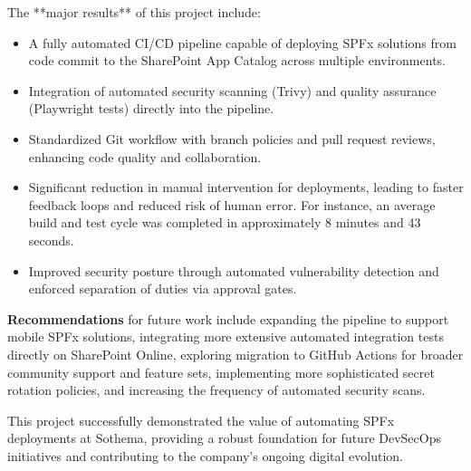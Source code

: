 The **major results** of this project include:
\begin{itemize}
    \item A fully automated CI/CD pipeline capable of deploying SPFx solutions from code commit to the SharePoint App Catalog across multiple environments.
    \item Integration of automated security scanning (Trivy) and quality assurance (Playwright tests) directly into the pipeline.
    \item Standardized Git workflow with branch policies and pull request reviews, enhancing code quality and collaboration.
    \item Significant reduction in manual intervention for deployments, leading to faster feedback loops and reduced risk of human error. For instance, an average build and test cycle was completed in approximately 8 minutes and 43 seconds.
    \item Improved security posture through automated vulnerability detection and enforced separation of duties via approval gates.
\end{itemize}

\textbf{Recommendations} for future work include expanding the pipeline to support mobile SPFx solutions, integrating more extensive automated integration tests directly on SharePoint Online, exploring migration to GitHub Actions for broader community support and feature sets, implementing more sophisticated secret rotation policies, and increasing the frequency of automated security scans.

This project successfully demonstrated the value of automating SPFx deployments at Sothema, providing a robust foundation for future DevSecOps initiatives and contributing to the company's ongoing digital evolution.